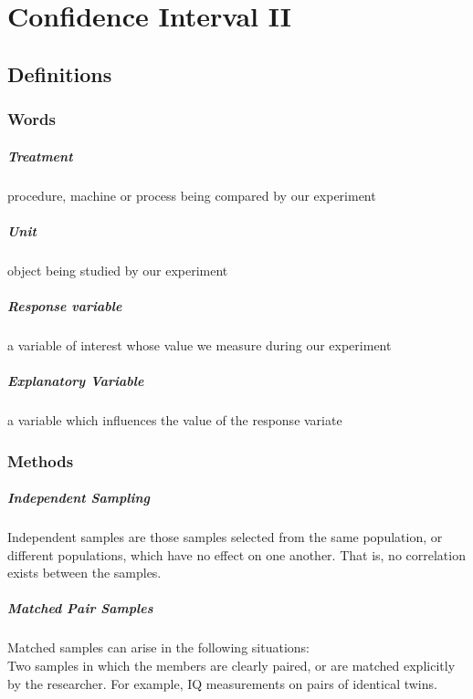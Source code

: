 \chapter{Confidence Interval II}
  \section{Definitions}
    \subsection{Words}
      \paragraph{Treatment} procedure, machine or process being compared by our experiment
      \paragraph{Unit} object being studied by our experiment
      \paragraph{Response variable} a variable of interest whose value we measure during our experiment
      \paragraph{Explanatory Variable} a variable which influences the value of the response variate

    \subsection{Methods}
      \paragraph{Independent Sampling} Independent samples are those samples selected from the same population, or different populations, which have no effect on one another. That is, no correlation exists between the samples.
      \paragraph{Matched Pair Samples} Matched samples can arise in the following situations:\\

        Two samples in which the members are clearly paired, or are matched explicitly by the researcher. For example, IQ measurements on pairs of identical twins. \\


